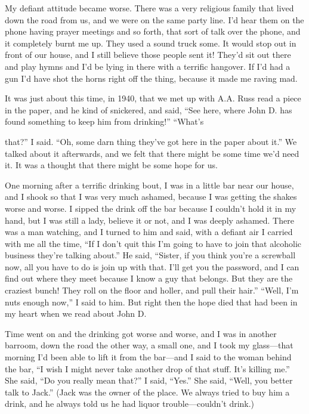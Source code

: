 \begin{biblechapter}
My defiant attitude became worse. There was a very religious family that lived down the road from us, and we were on the same party line. I’d hear them on the phone having prayer meetings and so forth, that sort of talk over the phone, and it completely burnt me up. They used a sound truck some. It would stop out in front of our house, and I still believe those people sent it! They’d sit out there and play hymns and I’d be lying in there with a terrific hangover. If I’d had a gun I’d have shot the horns right off the thing, because it made me raving mad.

It was just about this time, in 1940, that we met up with A.A. Russ read a piece in the paper, and he kind of snickered, and said, “See here, where John D. has found something to keep him from drinking!” “What’s

that?” I said. “Oh, some darn thing they’ve got here in the paper about it.” We talked about it afterwards, and we felt that there might be some time we’d need it. It was a thought that there might be some hope for us.

One morning after a terrific drinking bout, I was in a little bar near our house, and I shook so that I was very much ashamed, because I was getting the shakes worse and worse. I sipped the drink off the bar because I couldn’t hold it in my hand, but I was still a lady, believe it or not, and I was deeply ashamed. There was a man watching, and I turned to him and said, with a defiant air I carried with me all the time, “If I don’t quit this I’m going to have to join that alcoholic business they’re talking about.” He said, “Sister, if you think you’re a screwball now, all you have to do is join up with that. I’ll get you the password, and I can find out where they meet because I know a guy that belongs. But they are the craziest bunch! They roll on the floor and holler, and pull their hair.” “Well, I’m nuts enough now,” I said to him. But right then the hope died that had been in my heart when we read about John D.

Time went on and the drinking got worse and worse, and I was in another barroom, down the road the other way, a small one, and I took my glass—that morning I’d been able to lift it from the bar—and I said to the woman behind the bar, “I wish I might never take another drop of that stuff. It’s killing me.” She said, “Do you really mean that?” I said, “Yes.” She said, “Well, you better talk to Jack.” (Jack was the owner of the place. We always tried to buy him a drink, and he always told us he had liquor trouble—couldn’t drink.)


\end{biblechapter}
